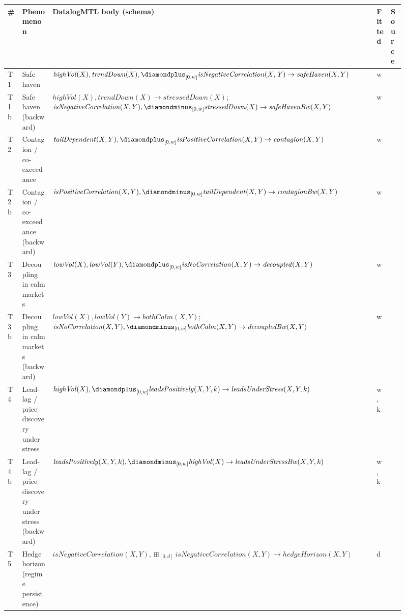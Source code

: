 \begin{figure}
\centering
\begin{tabular}{lllll}
\toprule
\# & Phenomenon & DatalogMTL body (schema) & Fitted & Source \\
\midrule
T1 & Safe haven & $\mathit{highVol}(X), \mathit{trendDown}(X), \diamondplus_{[0,w]} \mathit{isNegativeCorrelation(X,Y)} \to \mathit{safeHaven}(X,Y)$ & w & \cite{baur2010hedge,baur2010safehaven} \\
T1b & Safe haven (backward) & $\mathit{highVol}(X), \mathit{trendDown}(X) \to \mathit{stressedDown}(X)$; $\mathit{isNegativeCorrelation}(X,Y), \diamondminus_{[0,w]} \mathit{stressedDown}(X) \to \mathit{safeHavenBw}(X,Y)$ & w & \cite{baur2010hedge,baur2010safehaven} \\
T2 & Contagion / co-exceedance & $\mathit{tailDependent}(X,Y), \diamondplus_{[0,w]} \mathit{isPositiveCorrelation}(X,Y) \to \mathit{contagion}(X,Y)$ & w & \cite{longin2001extreme} \\
T2b & Contagion / co-exceedance (backward) & $\mathit{isPositiveCorrelation}(X,Y), \diamondminus_{[0,w]} \mathit{tailDependent}(X,Y) \to \mathit{contagionBw}(X,Y)$ & w & \cite{longin2001extreme} \\
T3 & Decoupling in calm markets & $\mathit{lowVol}(X), \mathit{lowVol}(Y), \diamondplus_{[0,w]} \mathit{isNoCorrelation}(X,Y) \to \mathit{decoupled}(X,Y)$ & w & \cite{ang2002asymmetric} \\
T3b & Decoupling in calm markets (backward) & $\mathit{lowVol}(X), \mathit{lowVol}(Y) \to \mathit{bothCalm}(X,Y)$; $\mathit{isNoCorrelation}(X,Y), \diamondminus_{[0,w]} \mathit{bothCalm}(X,Y) \to \mathit{decoupledBw}(X,Y)$ & w & \cite{ang2002asymmetric} \\
T4 & Lead-lag / price discovery under stress & $\mathit{highVol}(X), \diamondplus_{[0,w]} \mathit{leadsPositively}(X,Y,k) \to \mathit{leadsUnderStress}(X,Y,k)$ & w, k & \cite{hasbrouck1995onesecurity,dejong1997highfrequency} \\
T4b & Lead-lag / price discovery under stress (backward) & $\mathit{leadsPositively}(X,Y,k), \diamondminus_{[0,w]} \mathit{highVol}(X) \to \mathit{leadsUnderStressBw}(X,Y,k)$ & w, k & \cite{hasbrouck1995onesecurity,dejong1997highfrequency} \\
T5 & Hedge horizon (regime persistence) & $\mathit{isNegativeCorrelation}(X,Y), \boxplus_{[0,d]} \mathit{isNegativeCorrelation}(X,Y) \to \mathit{hedgeHorizon}(X,Y)$ & d & \cite{baur2010hedge} \\

\end{tabular}
\end{figure}
